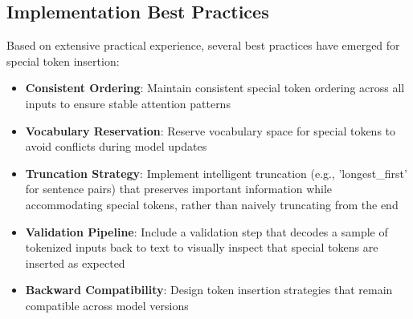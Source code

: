 \subsection{Implementation Best Practices}

Based on extensive practical experience, several best practices have emerged for special token insertion:

\begin{itemize}
\item \textbf{Consistent Ordering}: Maintain consistent special token ordering across all inputs to ensure stable attention patterns
\item \textbf{Vocabulary Reservation}: Reserve vocabulary space for special tokens to avoid conflicts during model updates
\item \textbf{Truncation Strategy}: Implement intelligent truncation (e.g., 'longest\_first' for sentence pairs) that preserves important information while accommodating special tokens, rather than naively truncating from the end
\item \textbf{Validation Pipeline}: Include a validation step that decodes a sample of tokenized inputs back to text to visually inspect that special tokens are inserted as expected
\item \textbf{Backward Compatibility}: Design token insertion strategies that remain compatible across model versions
\end{itemize}

